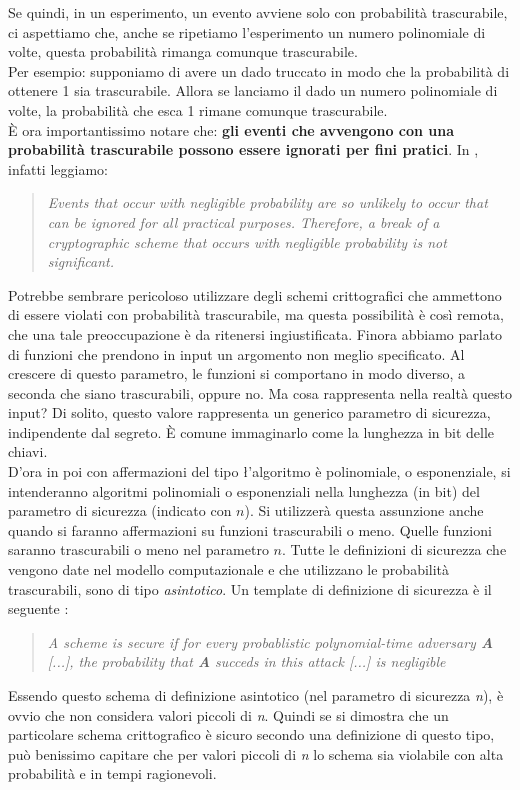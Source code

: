 \documentclass[a4paper,openright,twoside,12pt]{report}
\begin{document}
Se quindi, in un esperimento, un evento avviene solo con probabilit\`a trascurabile, ci aspettiamo che, anche se ripetiamo l'esperimento un numero polinomiale di volte, questa probabilit\`a
rimanga comunque trascurabile.\\
Per esempio: supponiamo di avere un dado truccato in modo che la probabilit\`a di ottenere 1 sia trascurabile. Allora se lanciamo il dado un numero polinomiale di volte, la probabilit\`a
che esca 1 rimane comunque trascurabile.\\
\`E ora importantissimo notare che:
\textbf{gli eventi che avvengono con una probabilit\`a trascurabile possono essere ignorati per fini pratici}.
In \cite{1206501}, infatti leggiamo:
\begin{quotation}
\emph{Events that occur with negligible probability are so unlikely to occur that can be ignored for all practical purposes. Therefore,
a break of a cryptographic scheme that occurs with negligible probability is not significant.}
\end{quotation}
Potrebbe sembrare pericoloso utilizzare degli schemi crittografici che ammettono di essere violati con probabilit\`a trascurabile, ma questa possibilit\`a \`e cos\`i remota, che una tale preoccupazione \`e da ritenersi
ingiustificata.
Finora abbiamo parlato di funzioni che prendono in input un argomento non meglio specificato. 
Al crescere di questo parametro, le funzioni si comportano in modo diverso, a seconda che siano trascurabili, oppure no.
Ma cosa rappresenta nella realt\`a questo input?
Di solito, questo valore rappresenta un generico parametro di sicurezza, indipendente dal segreto. \`E comune immaginarlo come la lunghezza in bit delle chiavi.\\
D'ora in poi con affermazioni del tipo \flqq\l'algoritmo \`e polinomiale, o esponenziale\frqq, si intenderanno algoritmi polinomiali o esponenziali nella lunghezza (in bit) del parametro di sicurezza (indicato con $n$). Si utilizzer\`a questa assunzione anche quando si faranno affermazioni su funzioni trascurabili o meno. Quelle funzioni saranno trascurabili o meno nel parametro $n$.
Tutte le definizioni di sicurezza che vengono date nel modello computazionale e che utilizzano le probabilit\`a trascurabili, sono di tipo \emph{asintotico}.
Un template di definizione di sicurezza è il seguente \cite{1206501}:
\begin{quotation}
\emph{A scheme is secure if for every probablistic polynomial-time adversary \textbf{A} [...], the probability that \textbf{A} succeds in this attack [...]
is negligible}
\end{quotation}
Essendo questo schema di definizione asintotico (nel parametro di sicurezza \emph{n}), \`e ovvio che non considera valori piccoli di \emph{n}.
Quindi se si dimostra che un particolare schema crittografico \`e sicuro secondo una definizione di questo tipo, pu\`o benissimo capitare che per valori piccoli di \emph{n} lo schema
sia violabile con alta probabilit\`a e in tempi ragionevoli.
\end{document}

